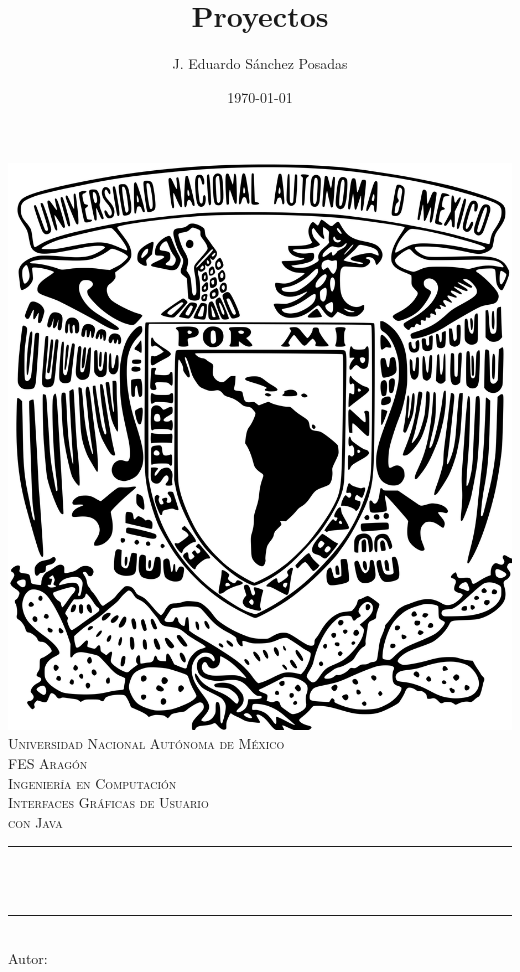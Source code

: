 \documentclass[11pt]{article}
\title{Proyectos}						%
\author{J. Eduardo Sánchez Posadas}					%
\date{\today}											%
\makeatletter
\let\thetitle\@title
\let\theauthor\@author
\makeatother
\begin{document}

\begin{titlepage}
	\centering
    \vspace*{0.5 cm}
\includegraphics[scale=0.05]{pics/escudo.png} \\[1.0 cm] 
\textsc{\Large Universidad Nacional Autónoma de México}\\[2.0 cm]
\textsc{\Large FES Aragón\\ Ingeniería en Computación}\\[0.5 cm]
\textsc{\large Interfaces Gráficas de Usuario \\ con Java}\\[0.5
cm] %
	\rule{\linewidth}{0.2 mm} \\[0.4 cm]
	{ \huge \bfseries \thetitle}\\
	\rule{\linewidth}{0.2 mm} \\[1.5 cm]
	 			{Autor: \large \theauthor}
%
	

\end{titlepage}
\end{document}
